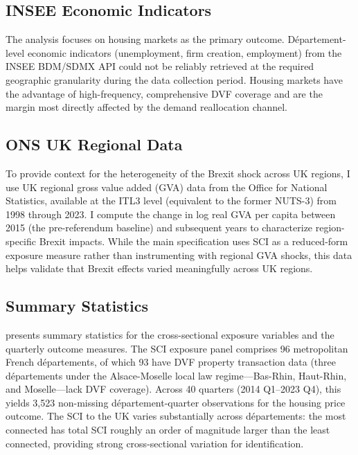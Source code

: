 \documentclass[12pt]{article}
\begin{document}
\subsection{INSEE Economic Indicators}

The analysis focuses on housing markets as the primary outcome. D\'epartement-level economic indicators (unemployment, firm creation, employment) from the INSEE BDM/SDMX API could not be reliably retrieved at the required geographic granularity during the data collection period. Housing markets have the advantage of high-frequency, comprehensive DVF coverage and are the margin most directly affected by the demand reallocation channel.

\subsection{ONS UK Regional Data}

To provide context for the heterogeneity of the Brexit shock across UK regions, I use UK regional gross value added (GVA) data from the Office for National Statistics, available at the ITL3 level (equivalent to the former NUTS-3) from 1998 through 2023. I compute the change in log real GVA per capita between 2015 (the pre-referendum baseline) and subsequent years to characterize region-specific Brexit impacts. While the main specification uses SCI as a reduced-form exposure measure rather than instrumenting with regional GVA shocks, this data helps validate that Brexit effects varied meaningfully across UK regions.

\subsection{Summary Statistics}

 presents summary statistics for the cross-sectional exposure variables and the quarterly outcome measures. The SCI exposure panel comprises 96 metropolitan French d\'epartements, of which 93 have DVF property transaction data (three d\'epartements under the Alsace-Moselle local law regime---Bas-Rhin, Haut-Rhin, and Moselle---lack DVF coverage). Across 40 quarters (2014 Q1--2023 Q4), this yields 3,523 non-missing d\'epartement-quarter observations for the housing price outcome. The SCI to the UK varies substantially across d\'epartements: the most connected has total SCI roughly an order of magnitude larger than the least connected, providing strong cross-sectional variation for identification.
\end{document}
